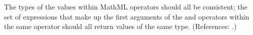 \removedRule
  {The types of the values within MathML  operators should all
be consistent; \ie the set of expressions that make up the first
arguments of the  and  operators within the
same  operator should all return values of the same type.}
  {(References: .)}
